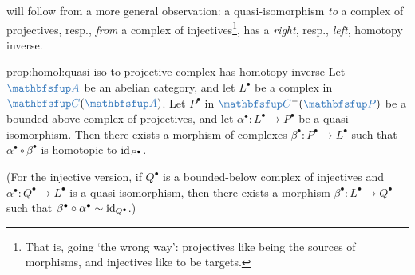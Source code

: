  will follow from a more general observation: a
quasi-isomorphism \emph{to} a complex of projectives, resp.,
\emph{from} a complex of injectives\footnote{That is, going `the wrong
  way': projectives like being the sources of morphisms, and
  injectives like to be targets.}, has a \emph{right}, resp.,
\emph{left}, homotopy inverse.

\begin{prop}{}{prop:homol:quasi-iso-to-projective-complex-has-homotopy-inverse}
  Let $\categ{A}$ be an abelian category, and let $L^\bullet$ be a
  complex in $\categ{C}(\categ{A})$. Let $P^\bullet$ in
  $\categ{C}^-(\categ{P})$ be a bounded-above complex of projectives,
  and let $\alpha^\bullet : L^\bullet \to P^\bullet$ be a
  quasi-isomorphism. Then there exists a morphism of complexes
  $\beta^\bullet : P^\bullet \to L^\bullet$ such that
  $\alpha^\bullet \circ \beta^\bullet$ is homotopic to
  $\operatorname{id}_{P^\bullet}$.

  (For the injective version, if $Q^\bullet$ is a bounded-below
  complex of injectives and $\alpha^\bullet : Q^\bullet \to L^\bullet$
  is a quasi-isomorphism, then there exists a morphism
  $\beta^\bullet : L^\bullet \to Q^\bullet$ such that
  $\beta^\bullet \circ \alpha^\bullet \sim \operatorname{id}_{Q^\bullet}$.)
\end{prop}
